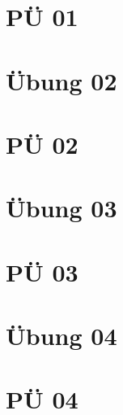 \documentclass[paper=a4, fontsize=11pt]{scrartcl}
\numberwithin{equation}{section}
\numberwithin{figure}{section}
\numberwithin{table}{section}
\begin{document}

\newpage

\section{PÜ 01}


\newpage

\section{Übung 02}


\newpage

\section{PÜ 02}


\newpage

\section{Übung 03}


\newpage

\section{PÜ 03}


\newpage

\section{Übung 04}


\newpage

\section{PÜ 04}

\end{document}

